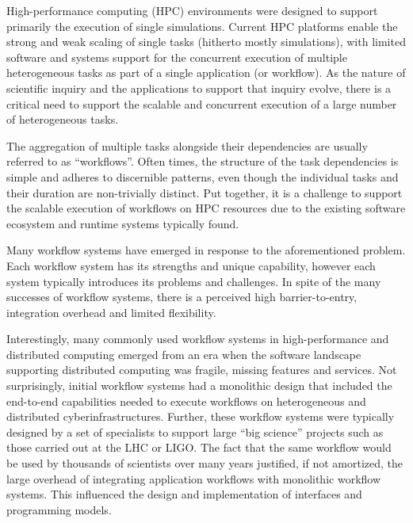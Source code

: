 
High-performance computing (HPC) environments were designed to support
primarily the execution of single simulations. Current HPC platforms enable
the strong and weak scaling of single tasks (hitherto mostly simulations),
with limited software and systems support for the concurrent execution of
multiple heterogeneous tasks as part of a single application (or workflow). As
the nature of scientific inquiry and the applications to support that inquiry
evolve, there is a critical need to support the scalable and concurrent
execution of a large number of heterogeneous tasks.


The aggregation of multiple tasks alongside their dependencies are usually
referred to as ``workflows''. Often times, the structure of the task
dependencies is simple and adheres to discernible patterns, even though the
individual tasks and their duration are non-trivially distinct. Put together,
it is a challenge to support the scalable execution of workflows on HPC
resources due to the existing software ecosystem and runtime systems
typically found.

Many workflow systems have emerged in response to the
aforementioned problem. Each workflow system has its strengths and unique
capability, however each system typically introduces its problems
and challenges. In spite of the many successes of workflow systems, there is
a perceived high barrier-to-entry, integration overhead and limited
flexibility.

Interestingly, many commonly used workflow systems in high-performance and
distributed computing emerged from an era when the software landscape
supporting distributed computing was fragile, missing features and services.
Not surprisingly, initial workflow systems had a monolithic design that
included the end-to-end capabilities needed to execute workflows on
heterogeneous and distributed cyberinfrastructures. Further, these workflow
systems were typically designed by a set of specialists to support large
``big science'' projects such as those carried out at the LHC or LIGO\@. The
fact that the same workflow would be used by thousands of scientists over
many years justified, if not amortized, the large overhead of integrating
application workflows with monolithic workflow systems. This influenced the
design and implementation of %
interfaces and programming models.

